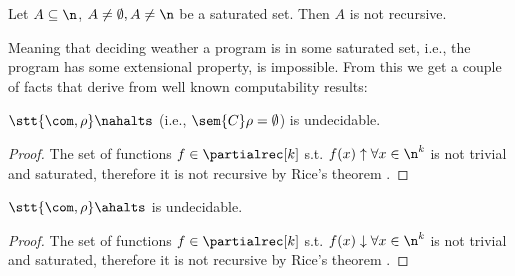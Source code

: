 \begin{theorem}
  Let \(A\subseteq \n\), \(A\neq \emptyset, A \neq \n\) be a saturated
  set. Then \(A\) is not recursive.
\end{theorem}

Meaning that deciding weather a program is in some saturated set, i.e.,
the program has some extensional property, is impossible.  From this
we get a couple of facts that derive from well known computability
results:

\begin{corollary}
  \(\stt{\com, \rho} \nahalts\) (i.e., \(\sem{C}\rho = \emptyset\)) is
  undecidable.
\end{corollary}

\begin{proof}
  The set of functions \(f\in \partialrec[k]\) s.t.
  \(f(x) \uparrow \forall x \in \n^k\) is not trivial and saturated,
  therefore it is not recursive by Rice's theorem
  \cite{rice1953classes}.
\end{proof}

\begin{corollary}
  \(\stt{\com, \rho} \ahalts\) is undecidable.
\end{corollary}
\begin{proof}
  The set of functions \(f\in \partialrec[k]\) s.t.
  \(f(x) \downarrow \forall x \in \n^k\) is not trivial and saturated,
  therefore it is not recursive by Rice's theorem
  \cite{rice1953classes}.
\end{proof}